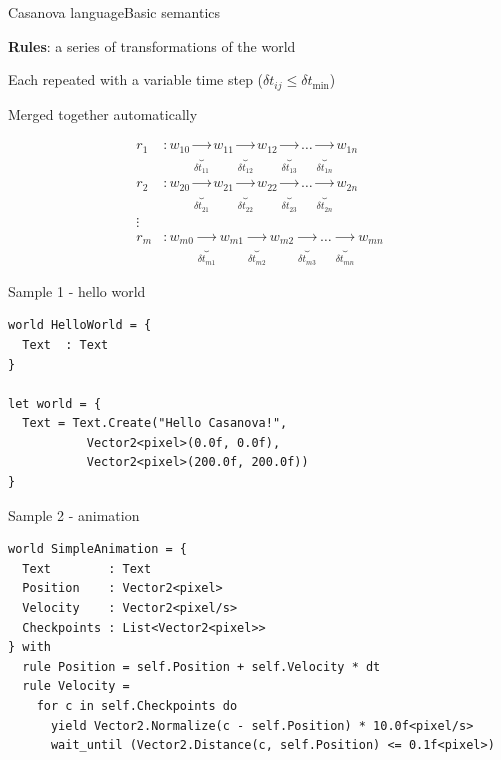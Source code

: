 \documentclass{beamer}
\begin{document}
\begin{slide}{Casanova language}{Basic semantics}{
\item \textbf{Rules}: a series of transformations of the world
\item Each repeated with a variable time step ($\delta t_{ij} \leq \delta t_{\text{min}}$)
\item Merged together automatically

\begin{align*}
r_1 &: w_{10} \underbrace{\rightarrow}_{\delta t_{11}} w_{11} \underbrace{\rightarrow}_{\delta t_{12}} w_{12} \underbrace{\rightarrow}_{\delta t_{13}} \dots \underbrace{\rightarrow}_{\delta t_{1n}} w_{1n} \\
r_2 &: w_{20} \underbrace{\rightarrow}_{\delta t_{21}} w_{21} \underbrace{\rightarrow}_{\delta t_{22}} w_{22} \underbrace{\rightarrow}_{\delta t_{23}} \dots \underbrace{\rightarrow}_{\delta t_{2n}} w_{2n} \\
\vdots \\
r_m &: w_{m0} \underbrace{\rightarrow}_{\delta t_{m1}} w_{m1} \underbrace{\rightarrow}_{\delta t_{m2}} w_{m2} \underbrace{\rightarrow}_{\delta t_{m3}} \dots \underbrace{\rightarrow}_{\delta t_{mn}} w_{mn}
\end{align*}
}\end{slide}

\begin{frame}[fragile]{Sample 1 - hello world}
\begin{lstlisting}
world HelloWorld = {
  Text  : Text
}

let world = {
  Text = Text.Create("Hello Casanova!", 
           Vector2<pixel>(0.0f, 0.0f), 
           Vector2<pixel>(200.0f, 200.0f))
}
\end{lstlisting}
\end{frame}

\begin{frame}[fragile]{Sample 2 - animation}
\begin{lstlisting}
world SimpleAnimation = {
  Text        : Text
  Position    : Vector2<pixel>
  Velocity    : Vector2<pixel/s>
  Checkpoints : List<Vector2<pixel>>
} with
  rule Position = self.Position + self.Velocity * dt
  rule Velocity = 
    for c in self.Checkpoints do
      yield Vector2.Normalize(c - self.Position) * 10.0f<pixel/s>
      wait_until (Vector2.Distance(c, self.Position) <= 0.1f<pixel>)
\end{lstlisting}
\end{frame}
\end{document}
